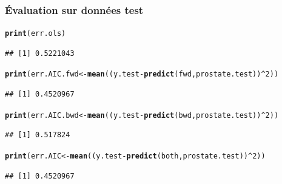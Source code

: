 \documentclass{beamer}\usepackage[]{graphicx}\usepackage[]{color}
\makeatletter
\newcommand{\hlnum}[1]{\textcolor[rgb]{0.686,0.059,0.569}{#1}}%
\newcommand{\hlopt}[1]{\textcolor[rgb]{0,0,0}{#1}}%
\newcommand{\hlstd}[1]{\textcolor[rgb]{0.345,0.345,0.345}{#1}}%
\newcommand{\hlkwb}[1]{\textcolor[rgb]{0.69,0.353,0.396}{#1}}%
\newcommand{\hlkwd}[1]{\textcolor[rgb]{0.737,0.353,0.396}{\textbf{#1}}}%
\newenvironment{kframe}{%
 \def\at@end@of@kframe{}%
 \ifinner\ifhmode%
  \def\at@end@of@kframe{\end{minipage}}%
  \begin{minipage}{\columnwidth}%
 \fi\fi%
 \def\FrameCommand##1{\hskip\@totalleftmargin \hskip-\fboxsep
 \colorbox{shadecolor}{##1}\hskip-\fboxsep
     \hskip-\linewidth \hskip-\@totalleftmargin \hskip\columnwidth}%
 \MakeFramed {\advance\hsize-\width
   \@totalleftmargin\z@ \linewidth\hsize
   \@setminipage}}%
 {\par\unskip\endMakeFramed%
 \at@end@of@kframe}
\newenvironment{knitrout}{}{} %
\makeatother
\begin{document}
\begin{frame}[containsverbatim]
  \frametitle{Évaluation sur données test}

\begin{knitrout}\scriptsize
{}\color{fgcolor}\begin{kframe}
\begin{alltt}
\hlkwd{print}\hlstd{(err.ols)}
\end{alltt}
\begin{verbatim}
## [1] 0.5221043
\end{verbatim}
\begin{alltt}
\hlkwd{print}\hlstd{(err.AIC.fwd}  \hlkwb{<-} \hlkwd{mean}\hlstd{((y.test}\hlopt{-}\hlkwd{predict}\hlstd{(fwd ,prostate.test))}\hlopt{^}\hlnum{2}\hlstd{))}
\end{alltt}
\begin{verbatim}
## [1] 0.4520967
\end{verbatim}
\begin{alltt}
\hlkwd{print}\hlstd{(err.AIC.bwd}  \hlkwb{<-} \hlkwd{mean}\hlstd{((y.test}\hlopt{-}\hlkwd{predict}\hlstd{(bwd ,prostate.test))}\hlopt{^}\hlnum{2}\hlstd{))}
\end{alltt}
\begin{verbatim}
## [1] 0.517824
\end{verbatim}
\begin{alltt}
\hlkwd{print}\hlstd{(err.AIC} \hlkwb{<-} \hlkwd{mean}\hlstd{((y.test}\hlopt{-}\hlkwd{predict}\hlstd{(both,prostate.test))}\hlopt{^}\hlnum{2}\hlstd{))}
\end{alltt}
\begin{verbatim}
## [1] 0.4520967
\end{verbatim}
\end{kframe}
\end{knitrout}
\end{frame}
\end{document}
